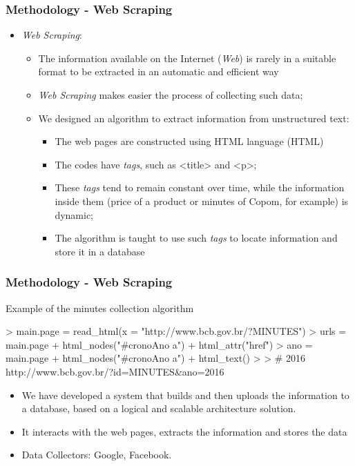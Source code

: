 \documentclass[aspectratio=169]{beamer}
\begin{document}
\begin{frame}\frametitle{Methodology - Web Scraping}
  \begin{itemize}
  \item \emph{Web Scraping}:
    \begin{itemize}
      \item The information available on the Internet (\emph{Web}) is rarely in a suitable format to be extracted in an automatic and efficient way
      \item \emph{Web Scraping} makes easier the process of collecting such data;
      \item We designed an algorithm to extract information from unstructured text:
      \begin{itemize}
        \item The web pages are constructed using HTML language (HTML)
        \item The codes have \emph{tags}, such as <title> and <p>;
        \item These \emph{tags} tend to remain constant over time, while the information inside them (price of a product or minutes of Copom, for example) is dynamic;
        \item The algorithm is taught to use such \emph{tags} to locate information and store it in a database
      \end{itemize}
    \end{itemize}
  \end{itemize}
\end{frame}

\begin{frame}[fragile]\frametitle{Methodology - Web Scraping} 
  \begin{block}{Example of the minutes collection algorithm}
\begin{Schunk}
\begin{Sinput}
> main.page = read_html(x = "http://www.bcb.gov.br/?MINUTES")
> urls = main.page %
+   html_nodes("#cronoAno a") %
+   html_attr("href")  
> ano = main.page %
+   html_nodes("#cronoAno a") %
+   html_text() 
> 
> # 2016 http://www.bcb.gov.br/?id=MINUTES&ano=2016                                               
\end{Sinput}
\end{Schunk}
  \end{block}
  \begin{itemize}
    \item We have developed a system that builds and then uploads the information to a database, based on a logical and scalable architecture solution.
    \item It interacts with the web pages, extracts the information and stores the data
    \item Data Collectors: Google, Facebook.
  \end{itemize}
\end{frame}
\end{document}
